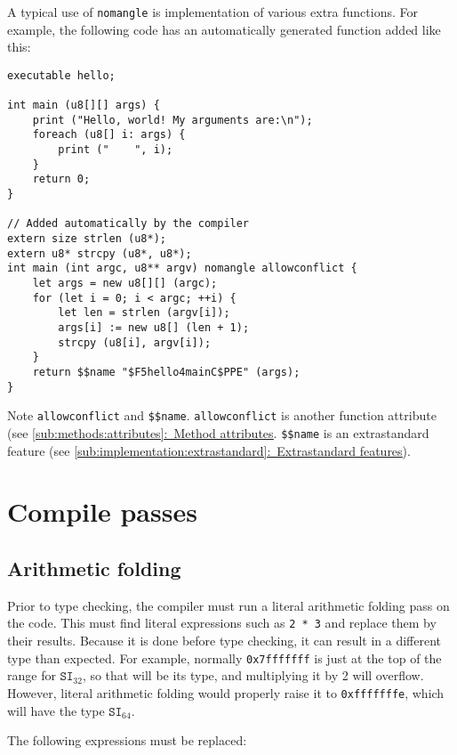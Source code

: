 \documentclass{article}
\newcommand{\R}[1]{\mathtt{#1}}
\newcommand{\textref}[2]{\hyperref[#1]{\underline{\ref*{#1}:~#2}}}
\begin{document}
A typical use of \texttt{nomangle} is implementation of various extra functions.
For example, the following code has an automatically generated function added
like this:

\begin{verbatim}
executable hello;

int main (u8[][] args) {
    print ("Hello, world! My arguments are:\n");
    foreach (u8[] i: args) {
        print ("    ", i);
    }
    return 0;
}

// Added automatically by the compiler
extern size strlen (u8*);
extern u8* strcpy (u8*, u8*);
int main (int argc, u8** argv) nomangle allowconflict {
    let args = new u8[][] (argc);
    for (let i = 0; i < argc; ++i) {
        let len = strlen (argv[i]);
        args[i] := new u8[] (len + 1);
        strcpy (u8[i], argv[i]);
    }
    return $$name "$F5hello4mainC$PPE" (args);
}
\end{verbatim}

Note \texttt{allowconflict} and \texttt{\$\$name}. \texttt{allowconflict} is
another function attribute (see
\textref{sub:methods:attributes}{Method attributes}.
\texttt{\$\$name} is an extrastandard feature
(see \textref{sub:implementation:extrastandard}{Extrastandard features}).

\section{Compile passes}
\label{sec:passes}

\subsection{Arithmetic folding}
\label{sub:passes:arithfold}
Prior to type checking, the compiler must run a literal arithmetic folding pass
on the code. This must find literal expressions such as \texttt{2~*~3} and
replace them by their results. Because it is done before type checking, it
can result in a different type than expected. For example, normally
\texttt{0x7fffffff} is just at the top of the range for $\R{SI}_{32}$, so that
will be its type, and multiplying it by 2 will overflow. However, literal
arithmetic folding would properly raise it to \texttt{0xfffffffe}, which will
have the type $\R{SI}_{64}$.

The following expressions must be replaced:
\end{document}
